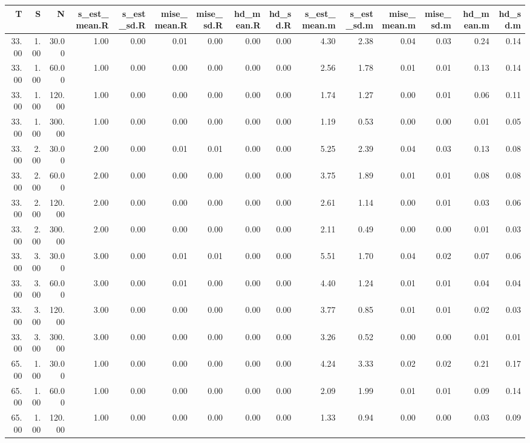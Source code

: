 \begin{table}[ht]
\centering
\begin{tabular}{rrrrrrrrrrrrrrr}
  \hline
T & S & N & s\_est\_mean.R & s\_est\_sd.R & mise\_mean.R & mise\_sd.R & hd\_mean.R & hd\_sd.R & s\_est\_mean.m & s\_est\_sd.m & mise\_mean.m & mise\_sd.m & hd\_mean.m & hd\_sd.m \\ 
  \hline
33.00 & 1.00 & 30.00 & 1.00 & 0.00 & 0.01 & 0.00 & 0.00 & 0.00 & 4.30 & 2.38 & 0.04 & 0.03 & 0.24 & 0.14 \\ 
  33.00 & 1.00 & 60.00 & 1.00 & 0.00 & 0.00 & 0.00 & 0.00 & 0.00 & 2.56 & 1.78 & 0.01 & 0.01 & 0.13 & 0.14 \\ 
  33.00 & 1.00 & 120.00 & 1.00 & 0.00 & 0.00 & 0.00 & 0.00 & 0.00 & 1.74 & 1.27 & 0.00 & 0.01 & 0.06 & 0.11 \\ 
  33.00 & 1.00 & 300.00 & 1.00 & 0.00 & 0.00 & 0.00 & 0.00 & 0.00 & 1.19 & 0.53 & 0.00 & 0.00 & 0.01 & 0.05 \\ 
  33.00 & 2.00 & 30.00 & 2.00 & 0.00 & 0.01 & 0.01 & 0.00 & 0.00 & 5.25 & 2.39 & 0.04 & 0.03 & 0.13 & 0.08 \\ 
  33.00 & 2.00 & 60.00 & 2.00 & 0.00 & 0.00 & 0.00 & 0.00 & 0.00 & 3.75 & 1.89 & 0.01 & 0.01 & 0.08 & 0.08 \\ 
  33.00 & 2.00 & 120.00 & 2.00 & 0.00 & 0.00 & 0.00 & 0.00 & 0.00 & 2.61 & 1.14 & 0.00 & 0.01 & 0.03 & 0.06 \\ 
  33.00 & 2.00 & 300.00 & 2.00 & 0.00 & 0.00 & 0.00 & 0.00 & 0.00 & 2.11 & 0.49 & 0.00 & 0.00 & 0.01 & 0.03 \\ 
  33.00 & 3.00 & 30.00 & 3.00 & 0.00 & 0.01 & 0.01 & 0.00 & 0.00 & 5.51 & 1.70 & 0.04 & 0.02 & 0.07 & 0.06 \\ 
  33.00 & 3.00 & 60.00 & 3.00 & 0.00 & 0.01 & 0.00 & 0.00 & 0.00 & 4.40 & 1.24 & 0.01 & 0.01 & 0.04 & 0.04 \\ 
  33.00 & 3.00 & 120.00 & 3.00 & 0.00 & 0.00 & 0.00 & 0.00 & 0.00 & 3.77 & 0.85 & 0.01 & 0.01 & 0.02 & 0.03 \\ 
  33.00 & 3.00 & 300.00 & 3.00 & 0.00 & 0.00 & 0.00 & 0.00 & 0.00 & 3.26 & 0.52 & 0.00 & 0.00 & 0.01 & 0.01 \\ 
  65.00 & 1.00 & 30.00 & 1.00 & 0.00 & 0.00 & 0.00 & 0.00 & 0.00 & 4.24 & 3.33 & 0.02 & 0.02 & 0.21 & 0.17 \\ 
  65.00 & 1.00 & 60.00 & 1.00 & 0.00 & 0.00 & 0.00 & 0.00 & 0.00 & 2.09 & 1.99 & 0.01 & 0.01 & 0.09 & 0.14 \\ 
  65.00 & 1.00 & 120.00 & 1.00 & 0.00 & 0.00 & 0.00 & 0.00 & 0.00 & 1.33 & 0.94 & 0.00 & 0.00 & 0.03 & 0.09 \\ 

\end{tabular}
\end{table}

